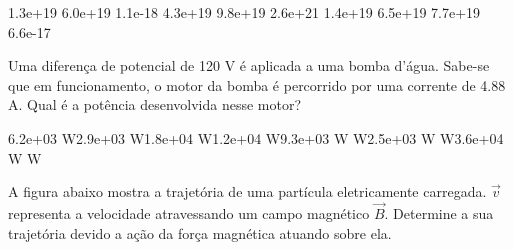 \documentclass[12pt, addpoints]{exam}
\begin{document}
\begin{questions}
\begin{multicols*}{2}
\begin{oneparchoices}
\choice 1.3e+19 \choice 6.0e+19 \choice 1.1e-18 \choice 4.3e+19 \choice 9.8e+19 \choice 2.6e+21 \choice 1.4e+19 \choice 6.5e+19 \choice 7.7e+19 \choice 6.6e-17 
\end{oneparchoices}\question Uma diferença de potencial de 120 V é aplicada a uma bomba d’água. Sabe-se que em funcionamento, o motor da bomba é percorrido por uma corrente de    4.88 A. Qual é a potência desenvolvida nesse motor?

\begin{oneparchoices}
\choice 6.2e+03 W\choice 2.9e+03 W\choice 1.8e+04 W\choice 1.2e+04 W\choice 9.3e+03 W W\choice 2.5e+03 W W\choice 3.6e+04 W W
\end{oneparchoices}\question A ﬁgura abaixo mostra a trajetória de uma partícula eletricamente carregada. $\vec{{v}}$ representa a velocidade atravessando um campo magnético $\vec{{B}}$. Determine a sua trajetória devido a ação da força magnética atuando sobre ela.
        
        \begin{center}
            \begin{minipage}[c]{0.5\linewidth}
            \end{minipage}
        \end{center}

        


\end{multicols*}
\end{questions}
\end{document}
